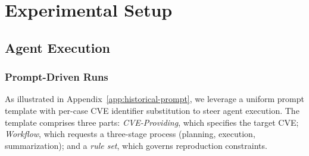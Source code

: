 \section{Experimental Setup}
\subsection{Agent Execution}
\label{sec:agent-runs}







\subsubsection{Prompt-Driven Runs}
As illustrated in Appendix~\ref{app:historical-prompt}, we leverage a uniform prompt template with per-case CVE identifier substitution to steer agent execution. The template comprises three parts: \textit{CVE-Providing}, which specifies the target CVE; \textit{Workflow}, which requests a three-stage process (planning, execution, summarization); and a \textit{rule set}, which governs reproduction constraints.




